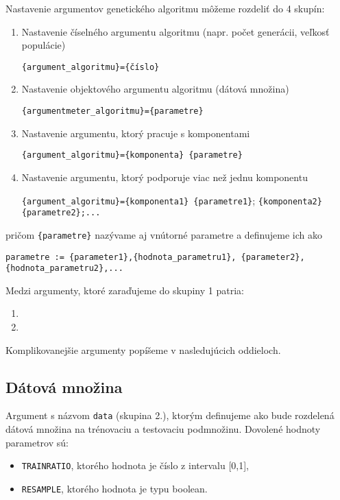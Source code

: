 Nastavenie argumentov genetického algoritmu môžeme rozdeliť do  4 skupín:
\begin{enumerate}
\item Nastavenie číselného argumentu algoritmu (napr. počet generácii, veľkosť populácie)
\begin{center}
\texttt{\{argument\_algoritmu\}=\{číslo\}}
\end{center} 
\item Nastavenie objektového argumentu algoritmu (dátová množina)
\begin{center}
\texttt{\{argumentmeter\_algoritmu\}=\{parametre\}}
\end{center} 
\item Nastavenie argumentu, ktorý pracuje s komponentami
\begin{center}
\texttt{\{argument\_algoritmu\}=\{komponenta\} \{parametre\}}
\end{center}
\item Nastavenie argumentu, ktorý podporuje viac než jednu komponentu
\begin{center}
\texttt{\{argument\_algoritmu\}=\{komponenta1\} \{parametre1\}};
\texttt{\{komponenta2\} \{parametre2\};...}
\end{center}
\end{enumerate}
pričom \texttt{\{parametre\}} nazývame aj vnútorné parametre a definujeme ich ako
\begin{center}
\texttt{parametre := \{parameter1\},\{hodnota\_parametru1\},
\{parameter2\},\{hodnota\_parametru2\},...}
\end{center}

Medzi argumenty, ktoré zaraďujeme do skupiny 1 patria:
\begin{enumerate}
\item
\item
\end{enumerate}
Komplikovanejšie argumenty popíšeme v nasledujúcich oddieloch.

\subsection*{Dátová množina}
Argument s názvom \verb|data| (skupina 2.), ktorým definujeme ako bude rozdelená dátová množina na trénovaciu a testovaciu podmnožinu. 
Dovolené hodnoty parametrov sú:
\begin{itemize}
\item \verb|TRAINRATIO|, ktorého hodnota je číslo z intervalu [0,1],
\item \verb|RESAMPLE|, ktorého hodnota je typu boolean.
\end{itemize}


